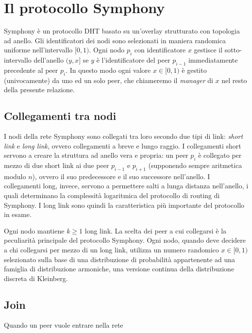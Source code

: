 \documentclass[prodmode,acmtap]{acmlarge}
\begin{document}
\section{Il protocollo Symphony} \label{symphony}
Symphony è un protocollo DHT basato su un'overlay strutturato con topologia ad anello. Gli identificatori dei nodi sono selezionati in maniera randomica uniforme nell'intervallo $[0,1)$. Ogni nodo $p_i$ con identificatore $x$ gestisce il sotto-intervallo dell'anello $(y,x]$ se $y$ è l'identificatore del peer $p_{i-1}$ immediatamente precedente al peer $p_i$. In questo modo ogni valore $x \in [0,1)$ è gestito (univocamente) da uno ed un solo peer, che chiameremo il \emph{manager} di $x$ nel resto della presente relazione.

\subsection{Collegamenti tra nodi}
I nodi della rete Symphony sono collegati tra loro secondo due tipi di link: \emph{short link} e \emph{long link}, ovvero collegamenti a breve e lungo raggio. I collegamenti short servono a creare la struttura ad anello vera e propria: un peer $p_i$ è collegato per mezzo di due short link ai due peer $p_{i-1}$ e $p_{i+1}$ (supponendo sempre aritmetica modulo $n$), ovvero il suo predecessore e il suo successore nell'anello. I collegamenti long, invece, servono a permettere salti a lunga distanza nell'anello, i quali determinano la complessità logaritmica del protocollo di routing di Symphony. I long link sono quindi la caratteristica più importante del protocollo in esame.

Ogni nodo mantiene $k \ge 1$ long link. La scelta dei peer a cui collegarsi è la peculiarità principale del protocollo Symphony. Ogni nodo, quando deve decidere a chi collegarsi per mezzo di un long link, utilizza un numero randomico $x \in [0,1)$ selezionato sulla base di una distribuzione di probabilità appartenente ad una famiglia di distribuzione armoniche, una versione continua della distribuzione discreta di Kleinberg.


\subsection{Join}
Quando un peer vuole entrare nella rete
\end{document}
